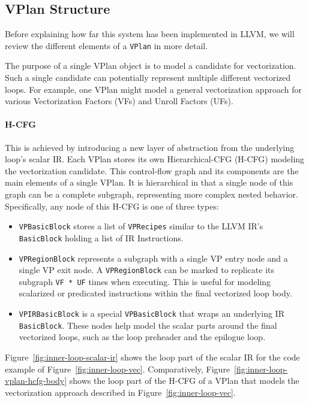 \documentclass[sigplan,11pt,nonacm]{acmart}
\begin{document}
\subsection{VPlan Structure}
Before explaining how far this system has been implemented in LLVM, we will review
the different elements of a \texttt{VPlan} in more detail.

The purpose of a single VPlan object is to model a candidate for vectorization. 
Such a single candidate can potentially represent multiple different vectorized loops. 
For example, one VPlan might model a general vectorization approach for various 
Vectorization Factors (VFs) and Unroll Factors (UFs).

\paragraph{H-CFG}
This is achieved by introducing a new layer of abstraction from the underlying loop's scalar IR.
Each VPlan stores its own Hierarchical-CFG (H-CFG) modeling the vectorization candidate. This 
control-flow graph and its components are the main elements of a single VPlan. It is hierarchical
in that a single node of this graph can be a complete subgraph, representing more complex nested
behavior.
Specifically, any node of this H-CFG is one of three types:

\begin{itemize}
  \item \texttt{VPBasicBlock} stores a list of \texttt{VPRecipes} similar to 
  the LLVM IR's \texttt{BasicBlock} holding a list of IR Instructions.
  \item \texttt{VPRegionBlock} represents a subgraph with a single VP entry node and a 
  single VP exit node. A \texttt{VPRegionBlock} can be marked to replicate its subgraph
  \texttt{VF * UF} times when executing. This is useful for modeling scalarized or predicated
  instructions within the final vectorized loop body.
  \item \texttt{VPIRBasicBlock} is a special \texttt{VPBasicBlock} that wraps an underlying
  IR \texttt{BasicBlock}. These nodes help model the scalar parts around the 
  final vectorized loops, such as the loop preheader and the epilogue loop.
\end{itemize}

Figure~\ref{fig:inner-loop-scalar-ir} shows the loop part of the scalar IR for the code example
of Figure~\ref{fig:inner-loop-vec}. Comparatively, Figure~\ref{fig:inner-loop-vplan-hcfg-body}
shows the loop part of the H-CFG of a VPlan that models the vectorization approach described
in Figure~\ref{fig:inner-loop-vec}.
\end{document}

